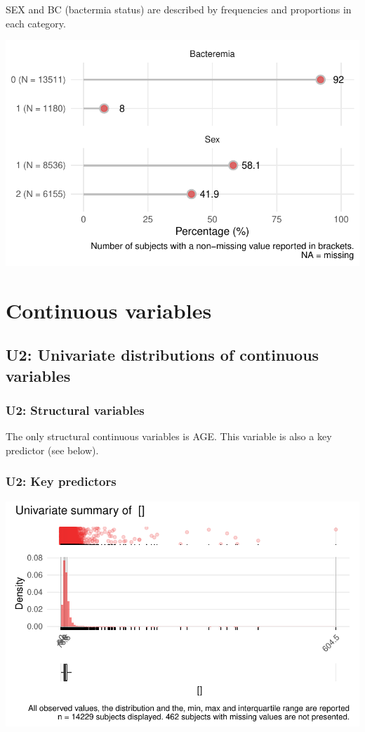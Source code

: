 \documentclass[
  letterpaper,
  DIV=11,
  numbers=noendperiod]{scrreport}
\begin{document}
SEX and BC (bactermia status) are described by frequencies and
proportions in each category.

\includegraphics{./Bact_univar_files/figure-pdf/catplot-1.pdf}

\hypertarget{continuous-variables}{%
\section{Continuous variables}\label{continuous-variables}}

\hypertarget{u2-univariate-distributions-of-continuous-variables}{%
\subsection{U2: Univariate distributions of continuous
variables}\label{u2-univariate-distributions-of-continuous-variables}}

\hypertarget{u2-structural-variables}{%
\subsubsection{U2: Structural variables}\label{u2-structural-variables}}

The only structural continuous variables is AGE. This variable is also a
key predictor (see below).

\hypertarget{u2-key-predictors}{%
\subsubsection{U2: Key predictors}\label{u2-key-predictors}}

\includegraphics{./Bact_univar_files/figure-pdf/uni02-1.pdf}
\end{document}
